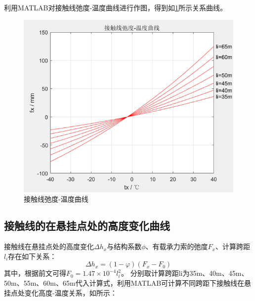 利用MATLAB对接触线弛度-温度曲线进行作图，得到如\ref{fig:-接触线弛度-温度曲线}所示关系曲线。
\begin{figure}[H]
	\centering
	\includegraphics[width=0.7\linewidth]{figures/接触线弛度-温度曲线}
	\caption{接触线弛度-温度曲线}
	\label{fig:-接触线弛度-温度曲线}
\end{figure}

\subsection{接触线的在悬挂点处的高度变化曲线}
接触线在悬挂点处的高度变化$\Delta h_x$与结构系数$\phi$、有载承力索的弛度$F_x$、计算跨距$l_i$存在如下关系：
$$
\varDelta h_x=(1-\varphi )(F_x-F_0)
$$
其中，根据前文可得$F_0=1.47×10^{-4}l^2_i$。
分别取计算跨距li为35m、40m、45m、50m、55m、60m、65m代入计算式，利用MATLAB可计算不同跨距下接触线在悬挂点处变化高度-温度关系，如所示：

\begin{table}[H]
	\centering
	\caption{接触线在悬挂点处变化高度-温度曲线表（跨距为li=35m）}
	\label{tab:my-table}
\end{table}

